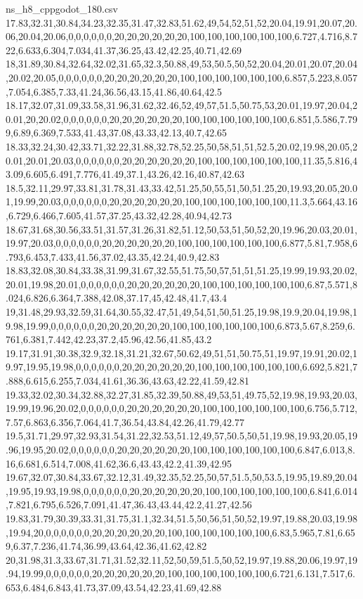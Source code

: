 \begin{filecontents*}[overwrite]{ns_h8_cppgodot_180.csv}
17.83,32.31,30.84,34.23,32.35,31.47,32.83,51.62,49,54,52,51,52,20.04,19.91,20.07,20.06,20.04,20.06,0,0,0,0,0,0,20,20,20,20,20,20,100,100,100,100,100,100,6.727,4.716,8.722,6.633,6.304,7.034,41.37,36.25,43.42,42.25,40.71,42.69
18,31.89,30.84,32.64,32.02,31.65,32.3,50.88,49,53,50.5,50,52,20.04,20.01,20.07,20.04,20.02,20.05,0,0,0,0,0,0,20,20,20,20,20,20,100,100,100,100,100,100,6.857,5.223,8.057,7.054,6.385,7.33,41.24,36.56,43.15,41.86,40.64,42.5
18.17,32.07,31.09,33.58,31.96,31.62,32.46,52,49,57,51.5,50.75,53,20.01,19.97,20.04,20.01,20,20.02,0,0,0,0,0,0,20,20,20,20,20,20,100,100,100,100,100,100,6.851,5.586,7.799,6.89,6.369,7.533,41.43,37.08,43.33,42.13,40.7,42.65
18.33,32.24,30.42,33.71,32.22,31.88,32.78,52.25,50,58,51,51,52.5,20.02,19.98,20.05,20.01,20.01,20.03,0,0,0,0,0,0,20,20,20,20,20,20,100,100,100,100,100,100,11.35,5.816,43.09,6.605,6.491,7.776,41.49,37.1,43.26,42.16,40.87,42.63
18.5,32.11,29.97,33.81,31.78,31.43,33.42,51.25,50,55,51,50,51.25,20,19.93,20.05,20.01,19.99,20.03,0,0,0,0,0,0,20,20,20,20,20,20,100,100,100,100,100,100,11.3,5.664,43.16,6.729,6.466,7.605,41.57,37.25,43.32,42.28,40.94,42.73
18.67,31.68,30.56,33.51,31.57,31.26,31.82,51.12,50,53,51,50,52,20,19.96,20.03,20.01,19.97,20.03,0,0,0,0,0,0,20,20,20,20,20,20,100,100,100,100,100,100,6.877,5.81,7.958,6.793,6.453,7.433,41.56,37.02,43.35,42.24,40.9,42.83
18.83,32.08,30.84,33.38,31.99,31.67,32.55,51.75,50,57,51,51,51.25,19.99,19.93,20.02,20.01,19.98,20.01,0,0,0,0,0,0,20,20,20,20,20,20,100,100,100,100,100,100,6.87,5.571,8.024,6.826,6.364,7.388,42.08,37.17,45,42.48,41.7,43.4
19,31.48,29.93,32.59,31.64,30.55,32.47,51,49,54,51,50,51.25,19.98,19.9,20.04,19.98,19.98,19.99,0,0,0,0,0,0,20,20,20,20,20,20,100,100,100,100,100,100,6.873,5.67,8.259,6.761,6.381,7.442,42.23,37.2,45.96,42.56,41.85,43.2
19.17,31.91,30.38,32.9,32.18,31.21,32.67,50.62,49,51,51,50.75,51,19.97,19.91,20.02,19.97,19.95,19.98,0,0,0,0,0,0,20,20,20,20,20,20,100,100,100,100,100,100,6.692,5.821,7.888,6.615,6.255,7.034,41.61,36.36,43.63,42.22,41.59,42.81
19.33,32.02,30.34,32.88,32.27,31.85,32.39,50.88,49,53,51,49.75,52,19.98,19.93,20.03,19.99,19.96,20.02,0,0,0,0,0,0,20,20,20,20,20,20,100,100,100,100,100,100,6.756,5.712,7.57,6.863,6.356,7.064,41.7,36.54,43.84,42.26,41.79,42.77
19.5,31.71,29.97,32.93,31.54,31.22,32.53,51.12,49,57,50.5,50,51,19.98,19.93,20.05,19.96,19.95,20.02,0,0,0,0,0,0,20,20,20,20,20,20,100,100,100,100,100,100,6.847,6.013,8.16,6.681,6.514,7.008,41.62,36.6,43.43,42.2,41.39,42.95
19.67,32.07,30.84,33.67,32.12,31.49,32.35,52.25,50,57,51.5,50,53.5,19.95,19.89,20.04,19.95,19.93,19.98,0,0,0,0,0,0,20,20,20,20,20,20,100,100,100,100,100,100,6.841,6.014,7.821,6.795,6.526,7.091,41.47,36.43,43.44,42.2,41.27,42.56
19.83,31.79,30.39,33.31,31.75,31.1,32.34,51.5,50,56,51,50,52,19.97,19.88,20.03,19.98,19.94,20,0,0,0,0,0,0,20,20,20,20,20,20,100,100,100,100,100,100,6.83,5.965,7.81,6.659,6.37,7.236,41.74,36.99,43.64,42.36,41.62,42.82
20,31.98,31.3,33.67,31.71,31.52,32.11,52,50,59,51.5,50,52,19.97,19.88,20.06,19.97,19.94,19.99,0,0,0,0,0,0,20,20,20,20,20,20,100,100,100,100,100,100,6.721,6.131,7.517,6.653,6.484,6.843,41.73,37.09,43.54,42.23,41.69,42.88
\end{filecontents*}

